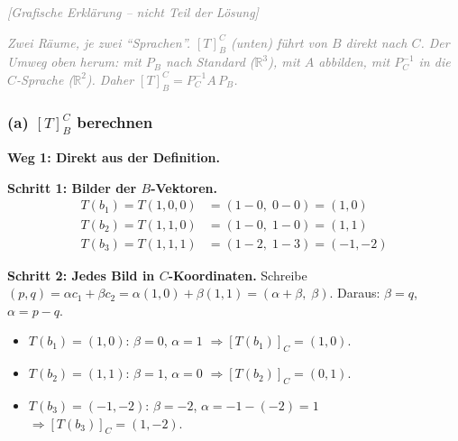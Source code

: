\documentclass[a4paper,12pt]{article}
\newcommand{\grafik}{\textcolor{gray}{\small\textit{[Grafische Erkl\"arung -- nicht Teil der L\"osung]}}}
\begin{document}
\grafik

\begin{center}
\end{center}

\textcolor{gray}{\small\textit{Zwei R\"aume, je zwei ``Sprachen''. $[T]_B^C$ (unten) f\"uhrt von $B$ direkt nach $C$. Der Umweg oben herum: mit $P_B$ nach Standard ($\mathbb{R}^3$), mit $A$ abbilden, mit $P_C^{-1}$ in die $C$-Sprache ($\mathbb{R}^2$). Daher $[T]_B^C = P_C^{-1} A\, P_B$.}}

\subsubsection*{(a) $[T]_B^C$ berechnen}

\textbf{Weg 1: Direkt aus der Definition.}

\textbf{Schritt 1: Bilder der $B$-Vektoren.}
\begin{align*}
T(b_1) = T(1,0,0) &= (1 - 0,\; 0 - 0) = (1, 0) \\
T(b_2) = T(1,1,0) &= (1 - 0,\; 1 - 0) = (1, 1) \\
T(b_3) = T(1,1,1) &= (1 - 2,\; 1 - 3) = (-1, -2)
\end{align*}

\textbf{Schritt 2: Jedes Bild in $C$-Koordinaten.} Schreibe $(p, q) = \alpha c_1 + \beta c_2 = \alpha(1,0) + \beta(1,1) = (\alpha + \beta,\; \beta)$. Daraus: $\beta = q$, $\alpha = p - q$.

\begin{itemize}[leftmargin=*, nosep]
    \item $T(b_1) = (1,0)$: $\beta = 0$, $\alpha = 1$ \; $\Rightarrow [T(b_1)]_C = (1, 0)$.
    \item $T(b_2) = (1,1)$: $\beta = 1$, $\alpha = 0$ \; $\Rightarrow [T(b_2)]_C = (0, 1)$.
    \item $T(b_3) = (-1,-2)$: $\beta = -2$, $\alpha = -1-(-2) = 1$ \; $\Rightarrow [T(b_3)]_C = (1, -2)$.
\end{itemize}
\end{document}
